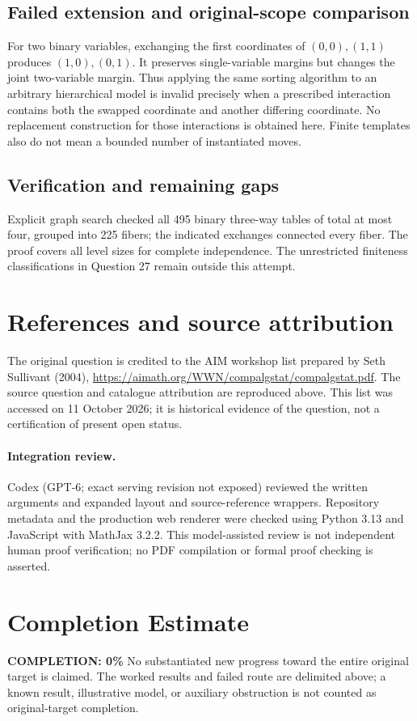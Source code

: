 \documentclass[11pt]{article}
\begin{document}
\subsection{Failed extension and original-scope comparison}
For two binary variables, exchanging the first coordinates of $(0,0),(1,1)$ produces $(1,0),(0,1)$. It preserves single-variable margins but changes the joint two-variable margin. Thus applying the same sorting algorithm to an arbitrary hierarchical model is invalid precisely when a prescribed interaction contains both the swapped coordinate and another differing coordinate. No replacement construction for those interactions is obtained here. Finite templates also do not mean a bounded number of instantiated moves.
\subsection{Verification and remaining gaps}
Explicit graph search checked all 495 binary three-way tables of total at most four, grouped into 225 fibers; the indicated exchanges connected every fiber. The proof covers all level sizes for complete independence. The unrestricted finiteness classifications in Question 27 remain outside this attempt.

\section{References and source attribution}
The original question is credited to the AIM workshop list prepared by Seth Sullivant (2004), \url{https://aimath.org/WWN/compalgstat/compalgstat.pdf}. The source question and catalogue attribution are reproduced above. This list was accessed on 11 October 2026; it is historical evidence of the question, not a certification of present open status.


\paragraph{Integration review.} Codex (GPT-6; exact serving revision not exposed) reviewed the written arguments and expanded layout and source-reference wrappers. Repository metadata and the production web renderer were checked using Python 3.13 and JavaScript with MathJax 3.2.2. This model-assisted review is not independent human proof verification; no PDF compilation or formal proof checking is asserted.

\section{Completion Estimate}
\noindent\textbf{COMPLETION: 0\%}
No substantiated new progress toward the entire original target is claimed. The worked results and failed route are delimited above; a known result, illustrative model, or auxiliary obstruction is not counted as original-target completion.
\end{document}
